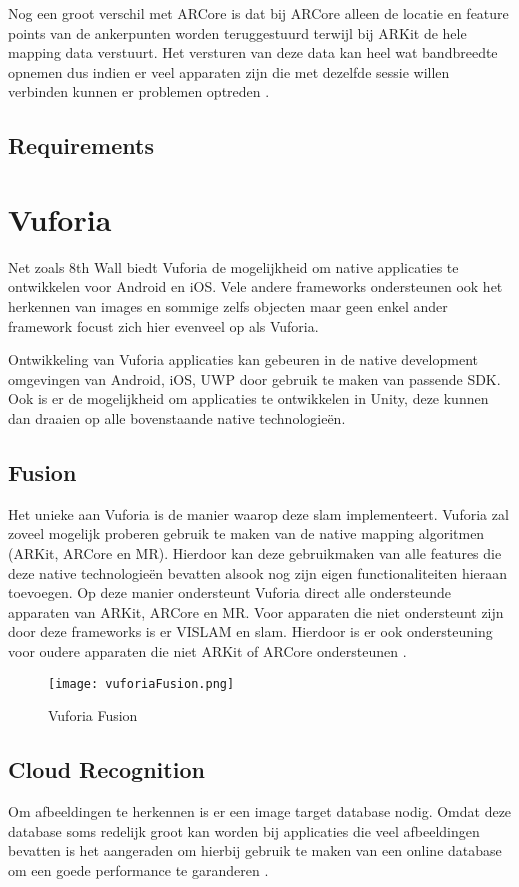 Nog een groot verschil met ARCore is dat bij ARCore alleen de locatie en feature points van de ankerpunten worden teruggestuurd terwijl bij ARKit de hele mapping data verstuurt. Het versturen van deze data kan heel wat bandbreedte opnemen dus indien er veel apparaten zijn die met dezelfde sessie willen verbinden kunnen er problemen optreden \autocite{ARKitMultiuser}.

\subsection{Requirements}


\section{Vuforia}
Net zoals 8th Wall biedt Vuforia de mogelijkheid om native applicaties te ontwikkelen voor Android en iOS. Vele andere frameworks ondersteunen ook het herkennen van images en sommige zelfs objecten maar geen enkel ander framework focust zich hier evenveel op als Vuforia.  

Ontwikkeling van Vuforia applicaties kan gebeuren in de native development omgevingen van Android, iOS, UWP door gebruik te maken van passende SDK. Ook is er de mogelijkheid om applicaties te ontwikkelen in Unity, deze kunnen dan draaien op alle bovenstaande native technologieën.

\subsection{Fusion}
Het unieke aan Vuforia is de manier waarop deze \acrshort{slam} implementeert. Vuforia zal zoveel mogelijk proberen gebruik te maken van de native mapping algoritmen (ARKit, ARCore en MR). Hierdoor kan deze gebruikmaken van alle features die deze native technologieën bevatten alsook nog zijn eigen functionaliteiten hieraan toevoegen. Op deze manier ondersteunt Vuforia direct alle ondersteunde apparaten van ARKit, ARCore en MR. Voor apparaten die niet ondersteunt zijn door deze frameworks is er VISLAM en \acrshort{slam}. Hierdoor is er ook ondersteuning voor oudere apparaten die niet ARKit of ARCore ondersteunen \autocite{VuforiaFusion}.
\begin{figure}
    \texttt{[image: vuforiaFusion.png]}
    \caption{Vuforia Fusion}
    \label{fig:vuforiaFusion}
\end{figure}

\subsection{Cloud Recognition}
Om afbeeldingen te herkennen is er een image target database nodig. Omdat deze database soms redelijk groot kan worden bij applicaties die veel afbeeldingen bevatten is het aangeraden om hierbij gebruik te maken van een online database om een goede performance te garanderen \autocite{VuforiaCloudReco}. 

